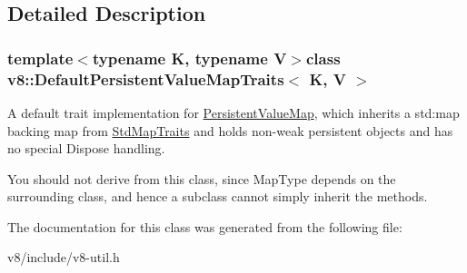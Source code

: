 \subsection{Detailed Description}
\subsubsection*{template$<$typename K, typename V$>$class v8\+::\+Default\+Persistent\+Value\+Map\+Traits$<$ K, V $>$}

A default trait implementation for \hyperlink{classv8_1_1PersistentValueMap}{Persistent\+Value\+Map}, which inherits a std\+:map backing map from \hyperlink{classv8_1_1StdMapTraits}{Std\+Map\+Traits} and holds non-\/weak persistent objects and has no special Dispose handling.

You should not derive from this class, since Map\+Type depends on the surrounding class, and hence a subclass cannot simply inherit the methods. 

The documentation for this class was generated from the following file\+:\begin{DoxyCompactItemize}
\item 
v8/include/v8-\/util.\+h\end{DoxyCompactItemize}
